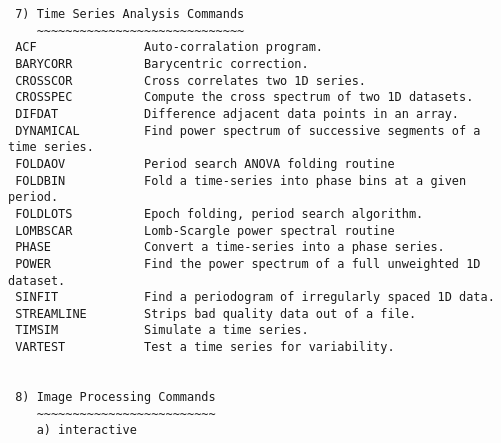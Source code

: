 \begin{verbatim}
 7) Time Series Analysis Commands
    ~~~~~~~~~~~~~~~~~~~~~~~~~~~~~
 ACF               Auto-corralation program.
 BARYCORR          Barycentric correction.
 CROSSCOR          Cross correlates two 1D series.
 CROSSPEC          Compute the cross spectrum of two 1D datasets.
 DIFDAT            Difference adjacent data points in an array.
 DYNAMICAL         Find power spectrum of successive segments of a time series.
 FOLDAOV           Period search ANOVA folding routine
 FOLDBIN           Fold a time-series into phase bins at a given period.
 FOLDLOTS          Epoch folding, period search algorithm.
 LOMBSCAR          Lomb-Scargle power spectral routine
 PHASE             Convert a time-series into a phase series.
 POWER             Find the power spectrum of a full unweighted 1D dataset.
 SINFIT            Find a periodogram of irregularly spaced 1D data.
 STREAMLINE        Strips bad quality data out of a file.
 TIMSIM            Simulate a time series.
 VARTEST           Test a time series for variability.


 8) Image Processing Commands 
    ~~~~~~~~~~~~~~~~~~~~~~~~~
    a) interactive


\end{verbatim}
